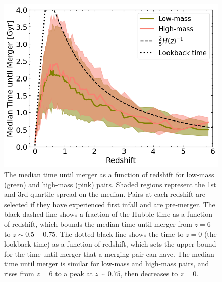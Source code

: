 \documentclass[twocolumn,linenumbers]{aastex631}
\begin{document}
\begin{figure}[htb]
    \centering
    \includegraphics[width=\columnwidth]{plots/bet-on-it/8_timescale.png}
    \caption{The median time until merger as a function of redshift for low-mass (green) and high-mass (pink) pairs. Shaded regions represent the 1st and 3rd quartile spread on the median. Pairs at each redshift are selected if they have experienced first infall and are pre-merger. 
    The black dashed line shows a fraction of the Hubble time as a function of redshift, which bounds the median time until merger from $z=6$ to $z\sim0.5-0.75$.
    The dotted black line shows the time to $z=0$ (the lookback time) as a function of redshift, which sets the upper bound for the time until merger that a merging pair can have. 
    The median time until merger is similar for low-mass and high-mass pairs, and rises from $z=6$ to a peak at $z\sim0.75$, then decreases to $z=0$.}
    \label{fig:timescales}
\end{figure}
\end{document}
